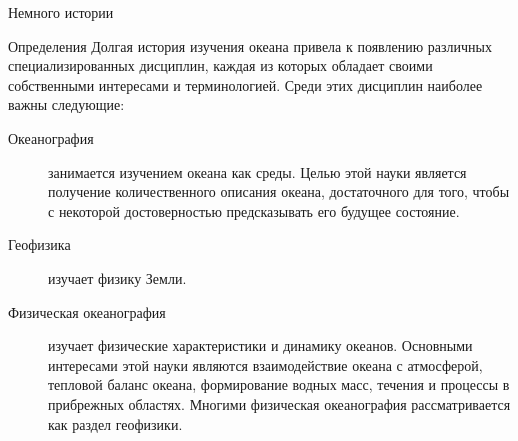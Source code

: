 \begin{chapter}{Немного истории}

\begin{section}{Определения}
Долгая история изучения океана привела к появлению различных
специализированных дисциплин, каждая из которых обладает своими
собственными интересами и терминологией. Среди этих дисциплин наиболее важны
следующие:
%

\begin{description}
\item[Океанография] занимается изучением океана как среды. Целью этой
науки является получение количественного описания океана, достаточного
для того, чтобы с некоторой достоверностью предсказывать его будущее
состояние.
%


\item[Геофизика] изучает физику Земли.
%

\item[Физическая океанография] изучает физические характеристики и
динамику океанов. Основными интересами этой науки являются
взаимодействие океана с атмосферой, тепловой баланс океана,
формирование водных масс, течения и процессы в прибрежных
областях. Многими физическая океанография рассматривается как раздел
геофизики.
%


\end{description}
\end{section}
\end{chapter}
